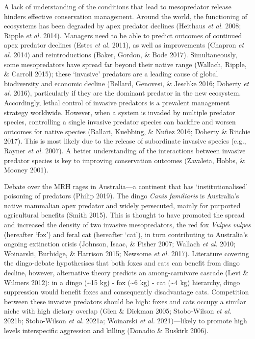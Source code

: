 \documentclass[11pt,a4paper,titlepage,twoside,openright]{style/unimelbthesis}
\begin{document}
\begin{mainmatter}
A lack of understanding of the conditions that lead to mesopredator release hinders effective conservation management. Around the world, the functioning of ecosystems has been degraded by apex predator declines (Heithaus \emph{et al.} 2008; Ripple \emph{et al.} 2014). Managers need to be able to predict outcomes of continued apex predator declines (Estes \emph{et al.} 2011), as well as improvements (Chapron \emph{et al.} 2014) and reintroductions (Baker, Gordon, \& Bode 2017). Simultaneously, some mesopredators have spread far beyond their native range (Wallach, Ripple, \& Carroll 2015); these `invasive' predators are a leading cause of global biodiversity and economic decline (Bellard, Genovesi, \& Jeschke 2016; Doherty \emph{et al.} 2016), particularly if they are the dominant predator in the new ecosystem. Accordingly, lethal control of invasive predators is a prevalent management strategy worldwide. However, when a system is invaded by multiple predator species, controlling a single invasive predator species can backfire and worsen outcomes for native species (Ballari, Kuebbing, \& Nuñez 2016; Doherty \& Ritchie 2017). This is most likely due to the release of subordinate invasive species (e.g., Rayner \emph{et al.} 2007). A better understanding of the interactions between invasive predator species is key to improving conservation outcomes (Zavaleta, Hobbs, \& Mooney 2001).

Debate over the MRH rages in Australia---a continent that has `institutionalised' poisoning of predators (Philip 2019). The dingo \emph{Canis familiaris} is Australia's native mammalian apex predator and widely persecuted, mainly for purported agricultural benefits (Smith 2015). This is thought to have promoted the spread and increased the density of two invasive mesopredators, the red fox \emph{Vulpes vulpes} (hereafter `fox') and feral cat (hereafter `cat'), in turn contributing to Australia's ongoing extinction crisis (Johnson, Isaac, \& Fisher 2007; Wallach \emph{et al.} 2010; Woinarski, Burbidge, \& Harrison 2015; Newsome \emph{et al.} 2017). Literature covering the dingo-debate hypothesises that both foxes and cats can benefit from dingo decline, however, alternative theory predicts an among-carnivore cascade (Levi \& Wilmers 2012): in a dingo (\textasciitilde15 kg) - fox (\textasciitilde6 kg) - cat (\textasciitilde4 kg) hierarchy, dingo suppression would benefit foxes and consequently disadvantage cats. Competition between these invasive predators should be high: foxes and cats occupy a similar niche with high dietary overlap (Glen \& Dickman 2005; Stobo-Wilson \emph{et al.} 2021b; Stobo-Wilson \emph{et al.} 2021a; Woinarski \emph{et al.} 2021)---likely to promote high levels interspecific aggression and killing (Donadio \& Buskirk 2006).


\end{mainmatter}
\end{document}
